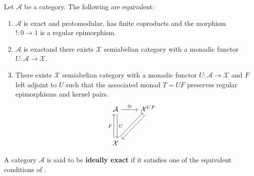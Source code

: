 \begin{mainbox}{}
    \begin{theo}\label{Ideally exact categories}
        Let $\mathcal{A}$ be a category. The following are equivalent:
        \begin{enumerate}
            \item $\mathcal{A}$ is exact and protomodular, has finite coproducts and the morphism $!:0 \to 1$ is a regular epimorphism.
            \item $\mathcal{A}$ is exact\footnotemark[1] and there exists $\mathcal{X}$ semiabelian category with a monadic functor $U: \mathcal{A} \to \mathcal{X}$.
            \item There exists $\mathcal{X}$ semiabelian category with a monadic functor $U: \mathcal{A} \to \mathcal{X}$ and $F$ left adjoint to $U$ such that the associated monad $T=UF$ preserves regular epimorphisms and kernel pairs.
            \[
\begin{tikzcd}
    \mathcal{A} \arrow[dd, "U", shift left] \arrow[r, "\cong"]      & \mathcal{X}^{UF} \arrow[ldd, shift left] \\
                                                                    &                                          \\
    \mathcal{X} \arrow[uu, "F", shift left] \arrow[ruu, shift left] &                                         
    \end{tikzcd}
            \]
        \end{enumerate}
    \end{theo}
\end{mainbox}

\begin{mainbox}{}
    \begin{defi}
        A category $\mathcal{A}$ is said to be \textbf{ideally exact} if it satisfies one of the equivalent conditions of .
    \end{defi}
\end{mainbox}

